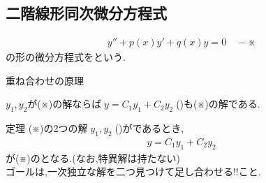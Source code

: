 \documentclass[a4paper]{jsarticle}
\begin{document}
\subsection{二階線形同次微分方程式}
\begin{eqnarray*}
    y''+p\left(x\right)y'+q\left(x\right)y=0\quad -※
\end{eqnarray*}
の形の微分方程式をという.
\begin{itembox}[l]{重ね合わせの原理}
    \begin{center}
        $y_1,y_2$が(※)の解ならば$\; y=C_1y_1+C_2y_2\;$()も(※)の解である.
    \end{center}
\end{itembox}
\begin{itembox}[l]{定理}
    (※)の2つの解$\;y_1,y_2\;$()がであるとき,
    \begin{eqnarray*}
        y=C_1y_1+C_2y_2
    \end{eqnarray*}
    が(※)のとなる.(なお,特異解は持たない)\\
    ゴールは,一次独立な解を二つ見つけて足し合わせる!!こと.
\end{itembox}
\end{document}
